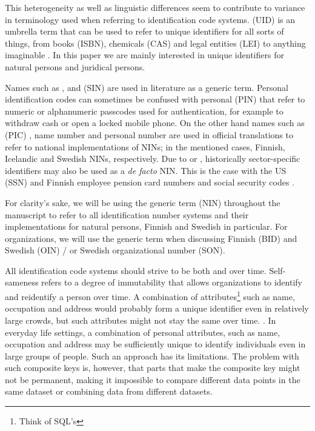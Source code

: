 This heterogeneity as well as linguistic differences seem to contribute to variance in terminology used when referring to identification code systems.  (UID) is an umbrella term that can be used to refer to unique identifiers for all sorts of things, from books (ISBN), chemicals (CAS) and legal entities (LEI) to anything imaginable \citep[see][]{dodge2005}. In this paper we are mainly interested in unique identifiers for natural persons and juridical persons. 

Names such as  \citep{dodge2005},  \citep{alastalo2022} and  (SIN) \citep{otjacques2007} are used in literature as a generic term. Personal identification codes can sometimes be confused with personal  (PIN) that refer to numeric or alphanumeric passcodes used for authentication, for example to withdraw cash or open a locked mobile phone. On the other hand names such as  (PIC) \citep{hetudvv, sund2012}, name number \citep{watson2010} and personal number \citep{scb2016} are used in official translations to refer to national implementations of NINs; in the mentioned cases, Finnish, Icelandic and Swedish NINs, respectively. Due to  \citep[see][]{brensinger2021, alastalo2022} or  \citep[see][]{dodge2005}, historically sector-specific identifiers may also be used as a \emph{de facto} NIN. This is the case with the US  (SSN) \citep{brensinger2021} and Finnish employee pension card numbers and social security codes \citep{alastalo2022}.

For clarity's sake, we will be using the generic term  (NIN) throughout the manuscript to refer to all identification number systems and their implementations for natural persons, Finnish  and Swedish  in particular. For organizations, we will use the generic term  when discussing Finnish  (BID) and Swedish  (OIN) / or Swedish organizational number (SON). 

All identification code systems should strive to be both  and  over time. Self-sameness refers to a degree of immutability that allows organizations to identify and reidentify a person over time. A combination of attributes\footnote{Think of SQL's } such as name, occupation and address would probably form a unique identifier even in relatively large crowds, but such attributes might not stay the same over time. \citep{brensinger2021}. In everyday life settings, a combination of personal attributes, such as name, occupation and address may be sufficiently unique to identify individuals even in large groups of people. Such an approach has its limitations. The problem with such composite keys is, however, that parts that make the composite key might not be permanent, making it impossible to compare different data points in the same dataset or combining data from different datasets.

